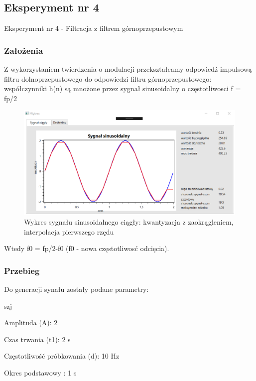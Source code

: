 \documentclass[12pt]{article}
\begin{document}
\subsection{Eksperyment nr 4}

Eksperyment nr 4  - Filtracja z filtrem górnoprzepustowym
\subsubsection{Założenia}
Z wykorzystaniem twierdzenia o modulacji przekształcamy odpowiedź impulsową filtru dolnoprzepustowego do odpowiedzi filtru górnoprzepustowego:
współczynniki h(n) są mnożone przez sygnał sinusoidalny  o częstotliwosci f = fp/2

\begin{figure}[h!]
 \centering
 \includegraphics[width=12.3cm]{SinKwantZaokrIntA2T2f10H2t1C.PNG}
 \vspace{-0.3cm}
 \caption{Wykres sygnału sinusoidalnego ciągły: kwantyzacja z zaokrągleniem, interpolacja pierwszego rzędu}
 \label{Wykres dla wyników eksperymentu drugiego}
\end{figure}

Wtedy f0 = fp/2-f0 (f0 -  nowa częstotliwosć odcięcia).

\subsubsection{Przebieg}
Do generacji synału zostały podane parametry:

\begin{labeling}{szj}
\item [Amplituda (A):] 2
\item [Czas trwania (t1):] 2 s
\item [Częstotliwość próbkowania (d): ] 10 Hz
\item [Okres podstawowy :] 1 s
\end{labeling}
\end{document}
